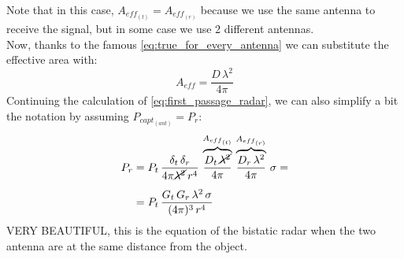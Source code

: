 Note that in this case, $A_{eff_{(t)}}=A_{eff_{(r)}}$ because we use the same antenna to receive the signal, but in some case we use 2 different antennas.\\
Now, thanks to the famous \cref{eq:true_for_every_antenna} we can substitute the effective area with:
\begin{equation}
    A_{eff}=\frac{D\,\lambda^2}{4\pi}
\end{equation}
Continuing the calculation of \cref{eq:first_passage_radar}, we can also simplify a bit the notation by assuming $P_{capt_{(ant)}}=P_r$:
\begin{align}\label{eq:received_power_radar}
    \begin{split}
    P_{r}&=P_t\,\frac{\delta_t\,\delta_r}{4\pi\cancel{\lambda^2}\,r^4}\,\overbrace{\frac{D_t\,\cancel{\lambda^2}}{4\pi}}^{A_{{eff}_{(t)}}}\,\overbrace{\frac{D_r\,\lambda^2}{4\pi}}^{A_{{eff}_{(r)}}}\,\sigma=\\[5pt]
    &=P_t\,\frac{G_t\,G_r\,\lambda^2\,\sigma}{(4\pi)^3\,r^4}
    \end{split}
\end{align}
VERY BEAUTIFUL, this is the equation of the bistatic radar when the two antenna are at the same distance from the object.
